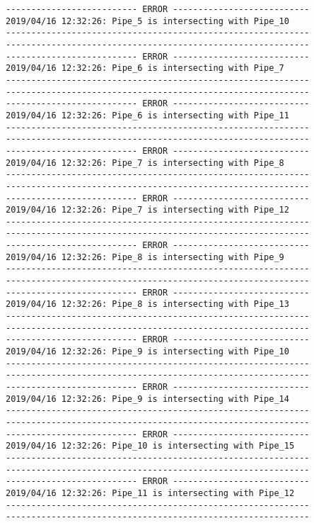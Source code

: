 \documentclass{article}
\begin{document}
{\begin{verbatim}
-------------------------- ERROR ---------------------------
2019/04/16 12:32:26: Pipe_5 is intersecting with Pipe_10
------------------------------------------------------------
------------------------------------------------------------
-------------------------- ERROR ---------------------------
2019/04/16 12:32:26: Pipe_6 is intersecting with Pipe_7
------------------------------------------------------------
------------------------------------------------------------
-------------------------- ERROR ---------------------------
2019/04/16 12:32:26: Pipe_6 is intersecting with Pipe_11
------------------------------------------------------------
------------------------------------------------------------
-------------------------- ERROR ---------------------------
2019/04/16 12:32:26: Pipe_7 is intersecting with Pipe_8
------------------------------------------------------------
------------------------------------------------------------
-------------------------- ERROR ---------------------------
2019/04/16 12:32:26: Pipe_7 is intersecting with Pipe_12
------------------------------------------------------------
------------------------------------------------------------
-------------------------- ERROR ---------------------------
2019/04/16 12:32:26: Pipe_8 is intersecting with Pipe_9
------------------------------------------------------------
------------------------------------------------------------
-------------------------- ERROR ---------------------------
2019/04/16 12:32:26: Pipe_8 is intersecting with Pipe_13
------------------------------------------------------------
------------------------------------------------------------
-------------------------- ERROR ---------------------------
2019/04/16 12:32:26: Pipe_9 is intersecting with Pipe_10
------------------------------------------------------------
------------------------------------------------------------
-------------------------- ERROR ---------------------------
2019/04/16 12:32:26: Pipe_9 is intersecting with Pipe_14
------------------------------------------------------------
------------------------------------------------------------
-------------------------- ERROR ---------------------------
2019/04/16 12:32:26: Pipe_10 is intersecting with Pipe_15
------------------------------------------------------------
------------------------------------------------------------
-------------------------- ERROR ---------------------------
2019/04/16 12:32:26: Pipe_11 is intersecting with Pipe_12
------------------------------------------------------------
------------------------------------------------------------

\end{verbatim}}
\end{document}
